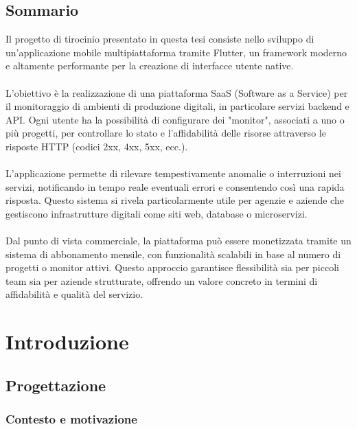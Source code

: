 \documentclass[12pt]{article}
\begin{document}
\begin{center}
\subsection*{Sommario}
\end{center}
Il progetto di tirocinio presentato in questa tesi consiste nello sviluppo di un’applicazione mobile multipiattaforma tramite Flutter, un framework moderno e altamente performante per la creazione di interfacce utente native.
\\\\ L'obiettivo è la realizzazione di una piattaforma SaaS (Software as a Service) per il monitoraggio di ambienti di produzione digitali, in particolare servizi backend e API. Ogni utente ha la possibilità di configurare dei "monitor", associati a uno o più progetti, per controllare lo stato e l'affidabilità delle risorse attraverso le risposte HTTP (codici 2xx, 4xx, 5xx, ecc.).
\\\\L'applicazione permette di rilevare tempestivamente anomalie o interruzioni nei servizi, notificando in tempo reale eventuali errori e consentendo così una rapida risposta. Questo sistema si rivela particolarmente utile per agenzie e aziende che gestiscono infrastrutture digitali come siti web, database o microservizi.
\\\\Dal punto di vista commerciale, la piattaforma può essere monetizzata tramite un sistema di abbonamento mensile, con funzionalità scalabili in base al numero di progetti o monitor attivi. Questo approccio garantisce flessibilità sia per piccoli team sia per aziende strutturate, offrendo un valore concreto in termini di affidabilità e qualità del servizio.


\newpage

\tableofcontents

\newpage



\section{Introduzione}

\subsection{Progettazione}

\subsubsection{Contesto e motivazione}
\end{document}
